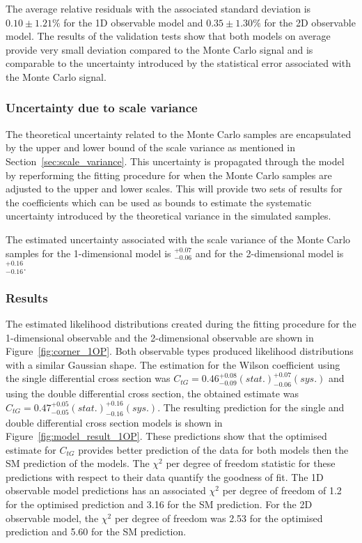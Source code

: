 \documentclass[a4paper,11pt]{article}
\begin{document}
The average relative residuals with the associated standard deviation is $0.10\pm1.21\%$ for the 1D observable model and $0.35\pm1.30\%$ for the 2D observable model.
The results of the validation tests show that both models on average provide very small deviation compared to the Monte Carlo signal and is comparable to the uncertainty introduced by the statistical error associated with the Monte Carlo signal.

\subsubsection{Uncertainty due to scale variance}
The theoretical uncertainty related to the Monte Carlo samples are encapsulated by the upper and lower bound of the scale variance as mentioned in Section~\ref{sec:scale_variance}.
This uncertainty is propagated through the model by reperforming the fitting procedure for when the Monte Carlo samples are adjusted to the upper and lower scales.
This will provide two sets of results for the coefficients which can be used as bounds to estimate the systematic uncertainty introduced by the theoretical variance in the simulated samples.

The estimated uncertainty associated with the scale variance of the Monte Carlo samples for the 1-dimensional model is $^{+0.07}_{-0.06}$ and for the 2-dimensional model is $^{+0.16}_{-0.16}$.

\subsubsection{Results}
The estimated likelihood distributions created during the fitting procedure for the 1-dimensional observable and the 2-dimensional observable are shown in Figure~\ref{fig:corner_1OP}.
Both observable types produced likelihood distributions with a similar Gaussian shape.
The estimation for the Wilson coefficient using the single differential cross section was $C_{tG}=0.46^{+0.08}_{-0.09}(stat.)^{+0.07}_{-0.06}(sys.)$ and using the double differential cross section, the obtained estimate was $C_{tG}=0.47^{+0.05}_{-0.05}(stat.)^{+0.16}_{-0.16}(sys.)$.
The resulting prediction for the single and double differential cross section models is shown in Figure~\ref{fig:model_result_1OP}.
These predictions show that the optimised estimate for $C_{tG}$ provides better prediction of the data for both models then the SM prediction of the models.
The $\chi^{2}$ per degree of freedom statistic for these predictions with respect to their data quantify the goodness of fit.
The 1D observable model predictions has an associated $\chi^{2}$ per degree of freedom of 1.2 for the optimised prediction and 3.16 for the SM prediction.
For the 2D observable model, the $\chi^{2}$ per degree of freedom was 2.53 for the optimised prediction and 5.60 for the SM prediction.
\end{document}
